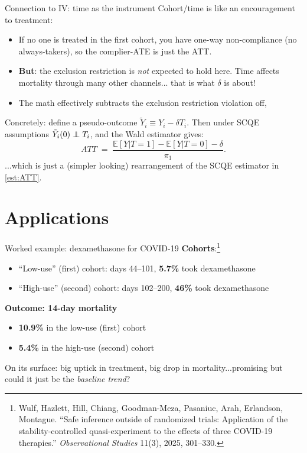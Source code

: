 \documentclass[handout,xcolor=dvipsnames,pdftex,hyperref={colorlinks=false}]{beamer}
\newcommand\E{\mathbb{E}}
\newcommand\indep{\protect\mathpalette{\protect\independenT}{\perp}}
\def\independenT#1#2{\mathrel{\rlap{$#1#2$}\mkern2mu{#1#2}}}
\begin{document}
\begin{frame}{Connection to IV: time as the instrument}
 Cohort/time is like an encouragement to treatment:
\small
\begin{itemize}
\item<2-> If no one is treated in the first cohort, you have one-way non-compliance (no always-takers), so the complier-ATE is just the ATT.
\item<3-> \textbf{But}: the exclusion restriction is \emph{not} expected to hold here. Time affects mortality through many other channels... that is what $\delta$ is about!
\item<4-> The math effectively subtracts the exclusion restriction violation off, 
\end{itemize}
\bigskip
\normalsize
{} Concretely: define a pseudo-outcome $\tilde Y_i \equiv Y_i - \delta T_i$. Then under SCQE assumptions $\tilde Y_i(0) \indep T_i$, and the Wald estimator gives:
\footnotesize
\[
ATT \;=\; \frac{\E[Y|T=1] - \E[Y|T=0] - \delta}{\pi_1}.
\]
...which is just a (simpler looking) rearrangement of the SCQE estimator in \eqref{est:ATT}.
\end{frame}

\section{Applications}

\begin{frame}{Worked example: dexamethasone for COVID-19}
\textbf{Cohorts}:\footnote{\scriptsize Wulf, Hazlett, Hill, Chiang, Goodman-Meza, Pasaniuc, Arah, Erlandson, Montague.
``Safe inference outside of randomized trials: Application of the stability-controlled quasi-experiment to the effects of three COVID-19 therapies.''
\emph{Observational Studies} 11(3), 2025, 301--330.}
\small
\begin{itemize}
\item ``Low-use'' (first) cohort: days 44--101, \textbf{5.7\%} took dexamethasone
\item ``High-use'' (second) cohort:  days 102--200, \textbf{46\%} took dexamethasone
\end{itemize}
\bigskip
\normalsize
{} \textbf{Outcome: 14-day mortality}
\small
\begin{itemize}
\item \textbf{10.9\%} in the low-use (first) cohort
\item \textbf{5.4\%} in the high-use (second) cohort
\end{itemize}
\bigskip
\normalsize
{} On its surface: big uptick in treatment, big drop in mortality...promising but could it just be the \emph{baseline trend}?
\end{frame}
\end{document}
